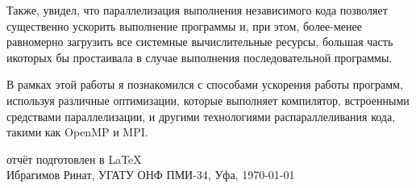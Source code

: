 \documentclass[a4paper,12pt]{article}
\begin{document}
Также, увидел, что параллелизация выполнения независимого кода позволяет существенно ускорить выполнение программы и, при этом, более-менее равномерно загрузить все системные вычислительные ресурсы, большая часть икоторых бы простаивала в случае выполнения последовательной программы.

В рамках этой работы я познакомился с способами ускорения работы программ, используя различные оптимизации, которые выполняет компилятор, встроенными средствами параллелизации, и другими технологиями распараллеливания кода, такими как OpenMP и MPI.
\vfill
\begin{center}
\small отчёт подготовлен в \LaTeX\\
Ибрагимов Ринат, УГАТУ ОНФ ПМИ-34, Уфа, \today
\end{center}
\end{document}
